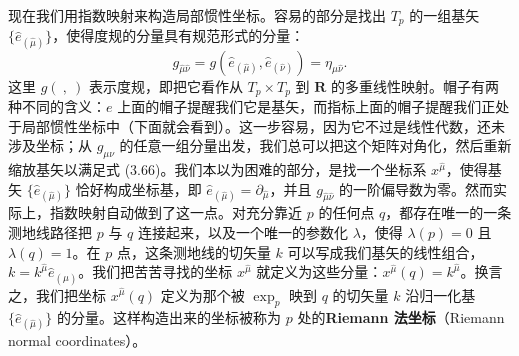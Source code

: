 现在我们用指数映射来构造局部惯性坐标。容易的部分是找出 $T_p$ 的一组基矢 $\{\hat{e}_{(\hat\mu)}\}$，使得度规的分量具有规范形式的分量：
\begin{equation*}
g_{\hat\mu\hat\nu} = g(\hat{e}_{(\hat\mu)}, \hat{e}_{(\hat\nu)}) = \eta_{\hat\mu\hat\nu}.
\tag{3.66}
\end{equation*}
这里 $g(\ ,\ )$ 表示度规，即把它看作从 $T_p \times T_p$ 到 $\mathbf{R}$ 的多重线性映射。帽子有两种不同的含义：$e$ 上面的帽子提醒我们它是基矢，而指标上面的帽子提醒我们正处于局部惯性坐标中（下面就会看到）。这一步容易，因为它不过是线性代数，还未涉及坐标；从 $g_{\mu\nu}$ 的任意一组分量出发，我们总可以把这个矩阵对角化，然后重新缩放基矢以满足式 (3.66)。我们本以为困难的部分，是找一个坐标系 $x^{\hat\mu}$，使得基矢 $\{\hat{e}_{(\hat\mu)}\}$ 恰好构成坐标基，即 $\hat{e}_{(\hat\mu)} = \partial_{\hat\mu}$，并且 $g_{\hat\mu\hat\nu}$ 的一阶偏导数为零。然而实际上，指数映射自动做到了这一点。对充分靠近 $p$ 的任何点 $q$，都存在唯一的一条测地线路径把 $p$ 与 $q$ 连接起来，以及一个唯一的参数化 $\lambda$，使得 $\lambda(p) = 0$ 且 $\lambda(q) = 1$。在 $p$ 点，这条测地线的切矢量 $k$ 可以写成我们基矢的线性组合，$k = k^{\hat\mu}\hat{e}_{(\hat\mu)}$。我们把苦苦寻找的坐标 $x^{\hat\mu}$ 就定义为这些分量：$x^{\hat\mu}(q) = k^{\hat\mu}$。换言之，我们把坐标 $x^{\hat\mu}(q)$ 定义为那个被 $\exp_p$ 映到 $q$ 的切矢量 $k$ 沿归一化基 $\{\hat{e}_{(\hat\mu)}\}$ 的分量。这样构造出来的坐标被称为 $p$ 处的\textbf{Riemann 法坐标}（Riemann normal coordinates）。

